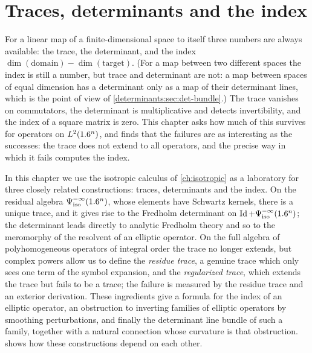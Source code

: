 \chapter{Traces, determinants and the index}\label{ch:determinants}
\providecommand{\Gs}[1]{\Gamma^{#1}}
\providecommand{\Psiisoph}[1]{\Psi^{#1}_{\mathrm{iso,ph}}}
\providecommand{\detFr}{\operatorname{det}_{\mathrm{Fr}}}
\providecommand{\TrRes}{\operatorname{Tr}_{\mathrm{R}}}
\providecommand{\TrReg}[1]{\overline{\operatorname{Tr}}_{#1}}
\providecommand{\Giso}[1]{G^{#1}_{\mathrm{iso}}}
\providecommand{\FP}{\operatorname*{FP}}
\providecommand{\Ell}{\operatorname{Ell}}
\providecommand{\Hiso}[1]{H^{#1}_{\mathrm{iso}}}

For a linear map of a finite-dimensional space to itself three numbers are
always available: the trace, the determinant, and the index
$\dim(\text{domain})-\dim(\text{target})$. (For a map between
two different spaces the index is still a number, but trace and determinant
are not: a map between spaces of equal dimension has a determinant only as a
map of their determinant lines, which is the point of view of
\cref{determinants:sec:det-bundle}.) The trace vanishes on
commutators, the determinant is multiplicative and detects invertibility,
and the index of a square matrix is zero. This chapter asks how much of this
survives for operators on $L^2(1.6^n)$, and finds that the failures are as
interesting as the successes: the trace does not extend to all operators,
and the precise way in which it fails computes the index.

In this chapter we use the isotropic calculus of \cref{ch:isotropic} as a
laboratory for three closely related constructions: traces, determinants and
the index. On the residual algebra $\Psi^{-\infty}_{\mathrm{iso}}(1.6^n)$, whose elements
have Schwartz kernels, there is a unique trace, and it gives rise to the
Fredholm determinant on $\operatorname{Id}+\Psi^{-\infty}_{\mathrm{iso}}(1.6^n)$; the determinant leads
directly to analytic Fredholm theory and so to the meromorphy of the
resolvent of an elliptic operator. On the full algebra of polyhomogeneous
operators of integral order the trace no longer extends, but complex powers
allow us to define the \emph{residue trace}, a genuine trace which only sees
one term of the symbol expansion, and the \emph{regularized trace}, which
extends the trace but fails to be a trace; the failure is measured by the
residue trace and an exterior derivation. These ingredients give a formula for
the index of an elliptic operator, an obstruction to inverting families of
elliptic operators by smoothing perturbations, and finally the determinant
line bundle of such a family, together with a natural connection whose
curvature is that obstruction.  shows how
these constructions depend on each other.

